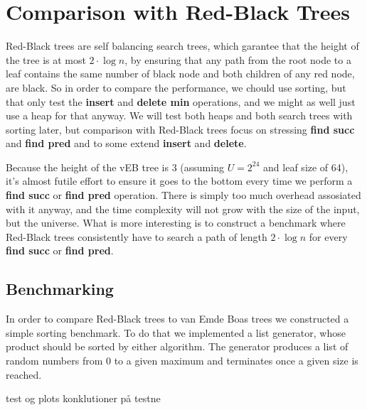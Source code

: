 \section*{Comparison with Red-Black Trees}
Red-Black trees are self balancing search trees, which garantee that the height of the tree is at most $2 \cdot \log n$, by ensuring that any path from the root node to a leaf contains the same number of black node and both children of any red node, are black. So in order to compare the performance, we chould use sorting, but that only test the \textbf{insert} and \textbf{delete min} operations, and we might as well just use a heap for that anyway. We will test both heaps and both search trees with sorting later, but comparison with Red-Black trees focus on stressing \textbf{find succ} and \textbf{find pred} and to some extend \textbf{insert} and \textbf{delete}.

Because the height of the vEB tree is $3$ (assuming $U = 2^{24}$ and leaf size of 64), it's almost futile effort to ensure it goes to the bottom every time we perform a \textbf{find succ} or \textbf{find pred} operation. There is simply too much overhead assosiated with it anyway, and the time complexity will not grow with the size of the input, but the universe. What is more interesting is to construct a benchmark where Red-Black trees consistently have to search a path of length $2 \cdot \log n$ for every \textbf{find succ} or \textbf{find pred}.

\subsection*{Benchmarking}

In order to compare Red-Black trees to van Emde Boas trees we constructed a simple sorting benchmark.
To do that we implemented a list generator, whose product should be sorted by either algorithm.
The generator produces a list of random numbers from 0 to a given maximum and terminates once a given size is reached.

test og plots
konklutioner på testne